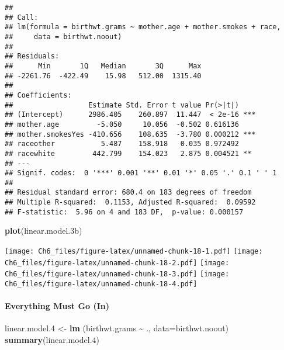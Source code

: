 \documentclass[
]{article}
\newenvironment{Shaded}{\begin{snugshade}}{\end{snugshade}}
\newcommand{\AttributeTok}[1]{\textcolor[rgb]{0.13,0.29,0.53}{#1}}
\newcommand{\FloatTok}[1]{\textcolor[rgb]{0.00,0.00,0.81}{#1}}
\newcommand{\FunctionTok}[1]{\textcolor[rgb]{0.13,0.29,0.53}{\textbf{#1}}}
\newcommand{\NormalTok}[1]{#1}
\newcommand{\OtherTok}[1]{\textcolor[rgb]{0.56,0.35,0.01}{#1}}
\newcommand{\SpecialCharTok}[1]{\textcolor[rgb]{0.81,0.36,0.00}{\textbf{#1}}}
\begin{document}
\begin{verbatim}
## 
## Call:
## lm(formula = birthwt.grams ~ mother.age + mother.smokes + race, 
##     data = birthwt.noout)
## 
## Residuals:
##      Min       1Q   Median       3Q      Max 
## -2261.76  -422.49    15.98   512.00  1315.40 
## 
## Coefficients:
##                  Estimate Std. Error t value Pr(>|t|)    
## (Intercept)      2986.405    260.897  11.447  < 2e-16 ***
## mother.age         -5.050     10.056  -0.502 0.616136    
## mother.smokesYes -410.656    108.635  -3.780 0.000212 ***
## raceother           5.487    158.918   0.035 0.972492    
## racewhite         442.799    154.023   2.875 0.004521 ** 
## ---
## Signif. codes:  0 '***' 0.001 '**' 0.01 '*' 0.05 '.' 0.1 ' ' 1
## 
## Residual standard error: 680.4 on 183 degrees of freedom
## Multiple R-squared:  0.1153, Adjusted R-squared:  0.09592 
## F-statistic:  5.96 on 4 and 183 DF,  p-value: 0.000157
\end{verbatim}

\begin{Shaded}
\begin{Highlighting}[]
\FunctionTok{plot}\NormalTok{(linear.model}\FloatTok{.3}\NormalTok{b)}
\end{Highlighting}
\end{Shaded}

\texttt{[image: Ch6\_files/figure-latex/unnamed-chunk-18-1.pdf]}
\texttt{[image: Ch6\_files/figure-latex/unnamed-chunk-18-2.pdf]}
\texttt{[image: Ch6\_files/figure-latex/unnamed-chunk-18-3.pdf]}
\texttt{[image: Ch6\_files/figure-latex/unnamed-chunk-18-4.pdf]}

\paragraph{Everything Must Go (In)}\label{everything-must-go-in}

\begin{Shaded}
\begin{Highlighting}[]
\NormalTok{linear.model}\FloatTok{.4} \OtherTok{\textless{}{-}} \FunctionTok{lm}\NormalTok{ (birthwt.grams }\SpecialCharTok{\textasciitilde{}}\NormalTok{ ., }\AttributeTok{data=}\NormalTok{birthwt.noout)}
\FunctionTok{summary}\NormalTok{(linear.model}\FloatTok{.4}\NormalTok{)}
\end{Highlighting}
\end{Shaded}
\end{document}
